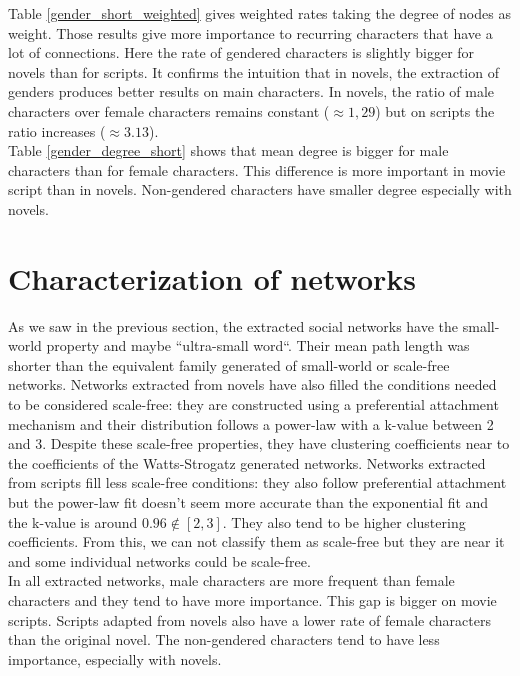 \documentclass[a4paper, 12pt]{report}
\begin{document}
Table \ref{gender_short_weighted} gives weighted rates taking the degree of nodes as weight. Those results give more importance to recurring characters that have a lot of connections. Here the rate of gendered characters is slightly bigger for novels than for scripts. It confirms the intuition that in novels, the extraction of genders produces better results on main characters. In novels, the ratio of male characters over female characters remains constant ($\approx 1,29$) but on scripts the ratio increases ($\approx 3.13$).\\

Table \ref{gender_degree_short} shows that mean degree is bigger for male characters than for female characters. This difference is more important in movie script than in novels. Non-gendered characters have smaller degree especially with novels.


\section{Characterization of networks}
\label{char}

As we saw in the previous section, the extracted social networks have the small-world property and maybe ``ultra-small word``. Their mean path length was shorter than the equivalent family generated of small-world or scale-free networks. Networks extracted from novels have also filled the conditions needed to be considered scale-free: they are constructed using a preferential attachment mechanism and their distribution follows a power-law with a k-value between 2 and 3. Despite these scale-free properties, they have clustering coefficients near to the coefficients of the Watts-Strogatz generated networks. Networks extracted from scripts fill less scale-free conditions: they also follow preferential attachment but the power-law fit doesn't seem more accurate than the exponential fit and the k-value is around $0.96 \notin [2,3]$. They also tend to be higher clustering coefficients. From this, we can not classify them as scale-free but they are near it and some individual networks could be scale-free.\\

In all extracted networks, male characters are more frequent than female characters and they tend to have more importance. This gap is bigger on movie scripts. Scripts adapted from novels also have a lower rate of female characters than the original novel. The non-gendered characters tend to have less importance, especially with novels.
\end{document}
